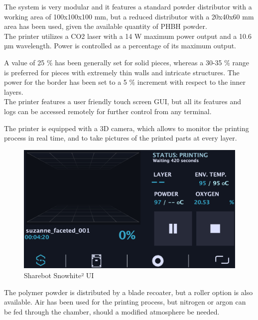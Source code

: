 \documentclass{article}
\begin{document}
        The system is very modular and it features a standard powder distributor with a working area of 
        100x100x100 mm, but a reduced distributor with a 20x40x60 mm area has been used, given the available 
        quantity of PHBH powder.  \\ 

        The printer utilizes a CO2 laser with a 14 W maximum power output and a 10.6 µm wavelength. Power is controlled as 
        a percentage of its maximum output.  

        A value of 25 \% has been generally set for solid pieces, whereas a 30-35 \% range is preferred for pieces with extremely thin walls and intricate structures.  
        The power for the border has been set to a 5 \% increment with respect to the inner layers. \\ 

        The printer features a user friendly touch screen GUI, but all its features and logs can be accessed remotely for further control from any terminal.  

        The printer is equipped with a 3D camera, which allows to monitor the printing process in real time, 
        and to take pictures of the printed parts at every layer. \\

        \begin{figure}[h!]
            \centering
            \includegraphics[width=\textwidth]{Pictures/sharebot_GUI.eps}
            \caption{Sharebot Snowhite² UI}
            \label{fig:Sharebot_UI}
        \end{figure}

        The polymer powder is distributed by a blade recoater, but a roller option is also available. 
        Air has been used for the printing process, but nitrogen or argon can be fed through the chamber, 
        should a modified atmosphere be needed.  \\
\end{document}
